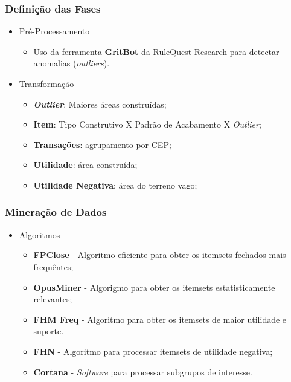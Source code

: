 \begin{frame}
    \frametitle{Definição das Fases}
     \begin{itemize}
        \item Pré-Processamento
            \begin{itemize}
                \item Uso da ferramenta \textbf{GritBot} da RuleQuest Research para detectar anomalias (\textit{outliers}).
            \end{itemize}
            
        \item Transformação
            \begin{itemize}
                \item \textbf{\textit{Outlier}}: Maiores áreas construídas;
                \item \textbf{Item}: Tipo Construtivo X Padrão de Acabamento X \textit{Outlier};
                \item \textbf{Transações}: agrupamento por CEP;
                \item \textbf{Utilidade}: área construída;
                \item \textbf{Utilidade Negativa}: área do terreno vago;
            \end{itemize}
    \end{itemize}
\end{frame}

\begin{frame}
    \frametitle{Mineração de Dados}
     \begin{itemize}
        \item Algoritmos
            \begin{itemize}
                \item \textbf{FPClose} - Algoritmo eficiente para obter os itemsets fechados mais frequêntes;
                \item \textbf{OpusMiner} - Algorigmo para obter os itemsets estatisticamente relevantes;
                \item \textbf{FHM Freq} - Algoritmo para obter os itemsets de maior utilidade e suporte.
                \item \textbf{FHN} - Algoritmo para processar itemsets de utilidade negativa;
                \item \textbf{Cortana} - \textit{Software} para processar subgrupos de interesse.
            \end{itemize}
    \end{itemize}
\end{frame}